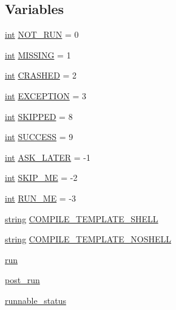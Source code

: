 \subsection*{Variables}
\begin{DoxyCompactItemize}
\item 
\hyperlink{xmltok_8h_a5a0d4a5641ce434f1d23533f2b2e6653}{int} \hyperlink{namespacewaflib_1_1_task_a166c1498985129b563b5f91a6ea6d10b}{N\+O\+T\+\_\+\+R\+UN} = 0
\item 
\hyperlink{xmltok_8h_a5a0d4a5641ce434f1d23533f2b2e6653}{int} \hyperlink{namespacewaflib_1_1_task_a214d0be3bce2fafc2d8fd3b42eb058c8}{M\+I\+S\+S\+I\+NG} = 1
\item 
\hyperlink{xmltok_8h_a5a0d4a5641ce434f1d23533f2b2e6653}{int} \hyperlink{namespacewaflib_1_1_task_a9a35547dbbb6386008ffa1beb1fcc62a}{C\+R\+A\+S\+H\+ED} = 2
\item 
\hyperlink{xmltok_8h_a5a0d4a5641ce434f1d23533f2b2e6653}{int} \hyperlink{namespacewaflib_1_1_task_aec3cb05a789439d67705a6233204250c}{E\+X\+C\+E\+P\+T\+I\+ON} = 3
\item 
\hyperlink{xmltok_8h_a5a0d4a5641ce434f1d23533f2b2e6653}{int} \hyperlink{namespacewaflib_1_1_task_a73d66d3fbe3c9bd739f2b917da2308d3}{S\+K\+I\+P\+P\+ED} = 8
\item 
\hyperlink{xmltok_8h_a5a0d4a5641ce434f1d23533f2b2e6653}{int} \hyperlink{namespacewaflib_1_1_task_a01a9ee98dbd5e6556060cd9f73e3aab2}{S\+U\+C\+C\+E\+SS} = 9
\item 
\hyperlink{xmltok_8h_a5a0d4a5641ce434f1d23533f2b2e6653}{int} \hyperlink{namespacewaflib_1_1_task_a082fadab26bb92e9c715a50479cc0349}{A\+S\+K\+\_\+\+L\+A\+T\+ER} = -\/1
\item 
\hyperlink{xmltok_8h_a5a0d4a5641ce434f1d23533f2b2e6653}{int} \hyperlink{namespacewaflib_1_1_task_a630c54556c2260d7d9d175ea64c7f98a}{S\+K\+I\+P\+\_\+\+ME} = -\/2
\item 
\hyperlink{xmltok_8h_a5a0d4a5641ce434f1d23533f2b2e6653}{int} \hyperlink{namespacewaflib_1_1_task_aaaf9c176a85a2be6df52c812439fb9c3}{R\+U\+N\+\_\+\+ME} = -\/3
\item 
\hyperlink{test__lib_f_l_a_c_2format_8c_ab02026ad0de9fb6c1b4233deb0a00c75}{string} \hyperlink{namespacewaflib_1_1_task_a0130b110ee338669bd9fc2ccbff6447d}{C\+O\+M\+P\+I\+L\+E\+\_\+\+T\+E\+M\+P\+L\+A\+T\+E\+\_\+\+S\+H\+E\+LL}
\item 
\hyperlink{test__lib_f_l_a_c_2format_8c_ab02026ad0de9fb6c1b4233deb0a00c75}{string} \hyperlink{namespacewaflib_1_1_task_aa7b0459a5a4ae624408a0f492b2be33b}{C\+O\+M\+P\+I\+L\+E\+\_\+\+T\+E\+M\+P\+L\+A\+T\+E\+\_\+\+N\+O\+S\+H\+E\+LL}
\item 
\hyperlink{namespacewaflib_1_1_task_a859c6336afe027ae782f84b9e49a4f0f}{run}
\item 
\hyperlink{namespacewaflib_1_1_task_a2111fff42675172fa695306131cea85f}{post\+\_\+run}
\item 
\hyperlink{namespacewaflib_1_1_task_ab82c5d532b6d9a91694fcca2fe13d6af}{runnable\+\_\+status}
\end{DoxyCompactItemize}


